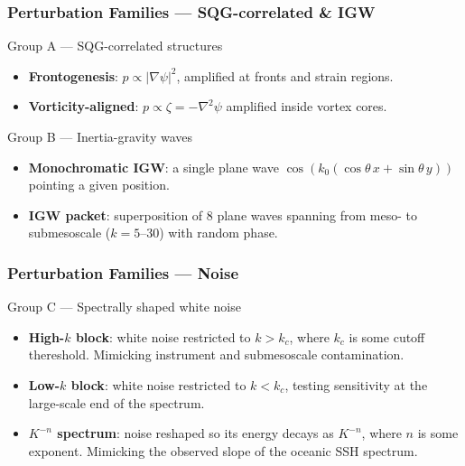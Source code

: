 \documentclass[
	11pt, %
]{beamer}
\begin{document}
\begin{frame}
    \frametitle{Perturbation Families --- SQG-correlated \& IGW}
    \begin{block}{Group A --- SQG-correlated structures}
        \begin{itemize}
            \item \textbf{Frontogenesis}: $p \propto |\nabla\psi|^2$, amplified at fronts and strain regions.
            \item \textbf{Vorticity-aligned}: $p \propto \zeta = -\nabla^2\psi$ amplified inside vortex cores.
        \end{itemize}
    \end{block}
    \begin{block}{Group B --- Inertia-gravity waves}
        \begin{itemize}
            \item \textbf{Monochromatic IGW}: a single plane wave $\cos(k_0(\cos\theta\, x + \sin\theta\, y))$ pointing a given position. 
            \item \textbf{IGW packet}: superposition of 8 plane waves spanning from meso- to submesoscale ($k = 5\text{--}30$) with random phase. 
        \end{itemize}
    \end{block}
\end{frame}


\begin{frame}
    \frametitle{Perturbation Families --- Noise}
    \begin{block}{Group C --- Spectrally shaped white noise}
        \begin{itemize}
            \item \textbf{High-$k$ block}: white noise restricted to $k > k_c$, where $k_c$ is some cutoff thereshold. Mimicking instrument and submesoscale contamination.
            \item \textbf{Low-$k$ block}: white noise restricted to $k < k_c$, testing sensitivity at the large-scale end of the spectrum.
            \item \textbf{$K^{-n}$ spectrum}: noise reshaped so its energy decays as $K^{-n}$, where $n$ is some exponent. Mimicking the observed slope of the oceanic SSH spectrum.
        \end{itemize}
    \end{block}
\end{frame}
\end{document}
